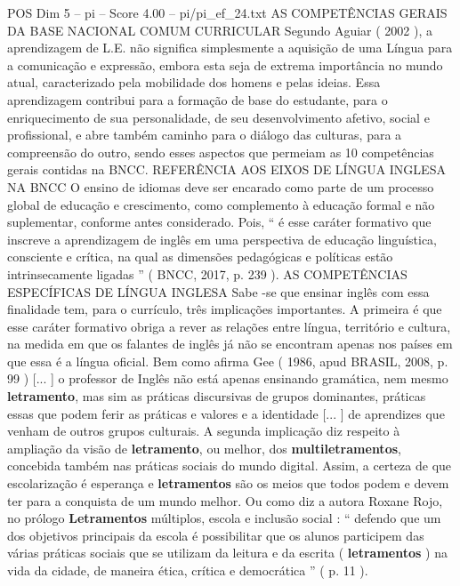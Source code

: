 \begin{textsample}{POS Dim 5 – pi – Score 4.00 – pi/pi\_ef\_24.txt}  \label{ex:f5_pos_239}
AS COMPETÊNCIAS GERAIS DA BASE NACIONAL COMUM CURRICULAR Segundo Aguiar ( 2002 ), a aprendizagem de L.E. não significa simplesmente a aquisição de uma Língua para a comunicação e expressão, embora esta seja de extrema importância no mundo atual, caracterizado pela mobilidade dos homens e pelas ideias.
Essa aprendizagem contribui para a formação de base do estudante, para o enriquecimento de sua personalidade, de seu desenvolvimento afetivo, social e profissional, e abre também caminho para o diálogo das culturas, para a compreensão do outro, sendo esses aspectos que permeiam as 10 competências gerais contidas na BNCC.
REFERÊNCIA AOS EIXOS DE LÍNGUA INGLESA NA BNCC O ensino de idiomas deve ser encarado como parte de um processo global de educação e crescimento, como complemento à educação formal e não suplementar, conforme antes considerado.
Pois, “ é esse caráter formativo que inscreve a aprendizagem de inglês em uma perspectiva de educação linguística, consciente e crítica, na qual as dimensões pedagógicas e políticas estão intrinsecamente ligadas ” ( BNCC, 2017, p. 239 ).
AS COMPETÊNCIAS ESPECÍFICAS DE LÍNGUA INGLESA Sabe -se que ensinar inglês com essa finalidade tem, para o currículo, três implicações importantes.
A primeira é que esse caráter formativo obriga a rever as relações entre língua, território e cultura, na medida em que os falantes de inglês já não se encontram apenas nos países em que essa é a língua oficial.
Bem como afirma Gee ( 1986, apud BRASIL, 2008, p. 99 ) [... ] o professor de Inglês não está apenas ensinando gramática, nem mesmo \textbf{letramento}, mas sim as práticas discursivas de grupos dominantes, práticas essas que podem ferir as práticas e valores e a identidade [... ] de aprendizes que venham de outros grupos culturais.
A segunda implicação diz respeito à ampliação da visão de \textbf{letramento}, ou melhor, dos \textbf{multiletramentos}, concebida também nas práticas sociais do mundo digital.
Assim, a certeza de que escolarização é esperança e \textbf{letramentos} são os meios que todos podem e devem ter para a conquista de um mundo melhor.
Ou como diz a autora Roxane Rojo, no prólogo \textbf{Letramentos} múltiplos, escola e inclusão social : “ defendo que um dos objetivos principais da escola é possibilitar que os alunos participem das várias práticas sociais que se utilizam da leitura e da escrita ( \textbf{letramentos} ) na vida da cidade, de maneira ética, crítica e democrática ” ( p. 11 ).

\end{textsample}
